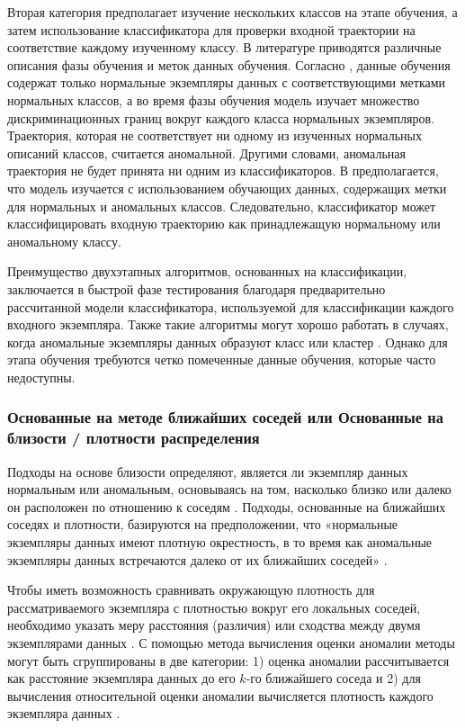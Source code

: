 Вторая категория предполагает изучение нескольких классов на этапе обучения, а затем использование классификатора для проверки входной траектории на соответствие каждому изученному классу. В литературе приводятся различные описания фазы обучения и меток данных обучения. Согласно \cite{article:15_survey_ad}, данные обучения содержат только нормальные экземпляры данных с соответствующими метками нормальных классов, а во время фазы обучения модель изучает множество дискриминационных границ вокруг каждого класса нормальных экземпляров. Траектория, которая не соответствует ни одному из изученных нормальных описаний классов, считается аномальной. Другими словами, аномальная траектория не будет принята ни одним из классификаторов. В \cite{article:6_survey_anom_det_rtuvs} предполагается, что модель изучается с использованием обучающих данных, содержащих метки для нормальных и аномальных классов. Следовательно, классификатор может классифицировать входную траекторию как принадлежащую нормальному или аномальному классу.

Преимущество двухэтапных алгоритмов, основанных на классификации, заключается в быстрой фазе тестирования благодаря предварительно рассчитанной модели классификатора, используемой для классификации каждого входного экземпляра. Также такие алгоритмы могут хорошо работать в случаях, когда аномальные экземпляры данных образуют класс или кластер \cite{inproceedings:18_ardod_lstd}. Однако для этапа обучения требуются четко помеченные данные обучения, которые часто недоступны.

\subsubsection{Основанные на методе ближайших соседей \cite{article:15_survey_ad} или Основанные на близости / плотности распределения \cite{article:6_survey_anom_det_rtuvs}\cite{inproceedings:18_ardod_lstd}}

Подходы на основе близости определяют, является ли экземпляр данных нормальным или аномальным, основываясь на том, насколько близко или далеко он расположен по отношению к соседям \cite{article:6_survey_anom_det_rtuvs}. Подходы, основанные на ближайших соседях и плотности, базируются на предположении, что «нормальные экземпляры данных имеют плотную окрестность, в то время как аномальные экземпляры данных встречаются далеко от их ближайших соседей» \cite{article:15_survey_ad}.

Чтобы иметь возможность сравнивать окружающую плотность для рассматриваемого экземпляра с плотностью вокруг его локальных соседей, необходимо указать меру расстояния (различия) или сходства между двумя экземплярами данных \cite{inproceedings:18_ardod_lstd}. С помощью метода вычисления оценки аномалии методы могут быть сгруппированы в две категории: 1) оценка аномалии рассчитывается как расстояние экземпляра данных до его $k$-го ближайшего соседа и 2) для вычисления относительной оценки аномалии вычисляется плотность каждого экземпляра данных \cite{article:15_survey_ad}.

